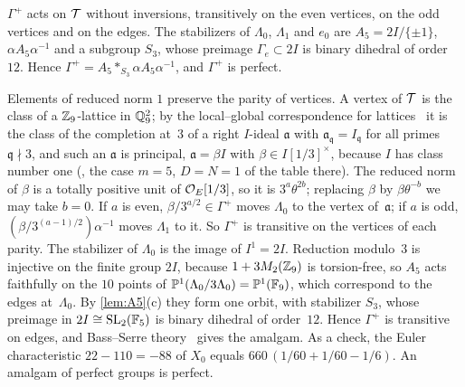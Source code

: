 \begin{lemma}\label{lem:amalgam}
\notformalized
$\Gamma^+$ acts on $\mathcal{T}$ without inversions, transitively on the even vertices, on the odd vertices and on the edges.
The stabilizers of $\Lambda_0$, $\Lambda_1$ and $e_0$ are $A_5=2I/\{\pm1\}$, $\alpha A_5\alpha^{-1}$ and a subgroup $S_3$,
whose preimage $\Gamma_e\subset2I$ is binary dihedral of order~$12$. Hence $\Gamma^+=A_5*_{S_3}\alpha A_5\alpha^{-1}$, and
$\Gamma^+$ is perfect.
\end{lemma}
\begin{informalproof}
Elements of reduced norm $1$ preserve the parity of vertices. A vertex of $\mathcal{T}$ is the class of a $\mathbb{Z}_9$-lattice in
$\mathbb{Q}_9^2$; by the local--global correspondence for lattices~\cite[Section~III.5.A]{Vigneras1980} it is the class of the
completion at~$3$ of a right $I$-ideal $\mathfrak a$ with $\mathfrak a_{\mathfrak q}=I_{\mathfrak q}$ for all primes
$\mathfrak q\nmid3$, and such an $\mathfrak a$ is principal, $\mathfrak a=\beta I$ with $\beta\in I[1/3]^\times$, because
$I$ has class number one (\cite[p.~155]{Vigneras1980}, the case $m=5$, $D=N=1$ of the table there). The reduced norm of
$\beta$ is a totally positive unit of $\mathcal{O}_E[1/3]$, so it is $3^a\theta^{2b}$; replacing $\beta$ by $\beta\theta^{-b}$ we may
take $b=0$. If $a$ is even, $\beta/3^{a/2}\in\Gamma^+$ moves $\Lambda_0$ to the vertex of~$\mathfrak a$; if $a$ is odd,
$(\beta/3^{(a-1)/2})\alpha^{-1}$ moves $\Lambda_1$ to it. So $\Gamma^+$ is transitive on the vertices of each parity. The
stabilizer of $\Lambda_0$ is the image of $I^1=2I$. Reduction modulo~$3$ is injective on the finite group $2I$, because
$1+3M_2(\mathbb{Z}_9)$ is torsion-free, so $A_5$ acts faithfully on the $10$ points of $\mathbb{P}^1(\Lambda_0/3\Lambda_0)=\mathbb{P}^1(\mathbb{F}_9)$,
which correspond to the edges at~$\Lambda_0$. By \cref{lem:A5}(c) they form one orbit, with stabilizer $S_3$, whose
preimage in $2I\cong\operatorname{SL}_2(\mathbb{F}_5)$ is binary dihedral of order~$12$. Hence $\Gamma^+$ is transitive on edges, and Bass--Serre
theory~\cite[Section~I.4]{Serre1980} gives the amalgam. As a check, the Euler characteristic $22-110=-88$ of $X_0$ equals
$660\,(1/60+1/60-1/6)$. An amalgam of perfect groups is perfect.
\end{informalproof}

